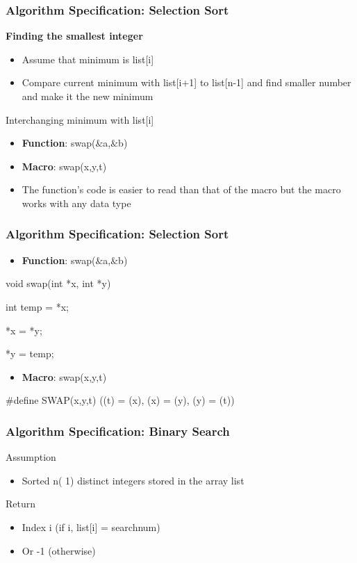 \documentclass[newPxFont,sthlmFooter,nooffset]{beamer}
\begin{document}
\begin{frame}[t,fragile]
  \frametitle{Algorithm Specification: Selection Sort}

\textbf{Finding the smallest integer}
\begin{itemize}
\item Assume that minimum is list[i]
\item Compare current minimum with list[i+1] to list[n-1] and find
  smaller number and make it the new minimum 
\end{itemize}

Interchanging minimum with list[i]

\begin{itemize}
	\item\textbf{Function}: swap($\&$a,$\&$b)
\end{itemize}

\begin{itemize}
	\item\textbf{Macro}: swap(x,y,t)
\end{itemize}
\begin{itemize}
	\item The function's code is easier to read than that of the macro but the macro works with any data type
\end{itemize}
\end{frame}

\begin{frame}[t,fragile]
\frametitle{Algorithm Specification: Selection Sort}
\begin{itemize}
\item\textbf{Function}: swap($\&$a,$\&$b)
\end{itemize}
\begin{codedef}
void swap(int *x, int *y){
	int temp = *x;
	
	*x = *y;
		
	*y = temp;
}
\end{codedef}
\begin{itemize}
\item\textbf{Macro}: swap(x,y,t)
\end{itemize}
\begin{codedef}
#define SWAP(x,y,t) ((t) = (x), (x) = (y), (y) = (t))
\end{codedef}
\end{frame}

\begin{frame}[t]
  \frametitle{Algorithm Specification: Binary Search}
Assumption
\begin{itemize}
\item Sorted n( 1) distinct integers stored in the array list
\end{itemize}

Return 
\begin{itemize}
\item Index i (if i, list[i] = searchnum)
\item Or -1 (otherwise)
\end{itemize}

\end{frame}
\end{document}
